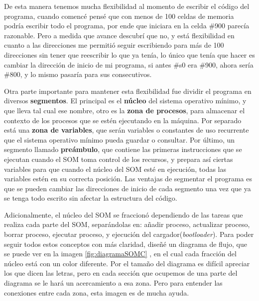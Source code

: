 \documentclass[letterpaper,12pt,oneside]{book}
\begin{document}
        De esta manera tenemos mucha flexibilidad al momento de escribir
		el código del programa, cuando comencé pensé que con menos de 100 celdas de memoria podría escribir todo el programa, por ende que iniciara
		en la celda \#900 parecía razonable. Pero a medida que avance
		descubrí que no, y está flexibilidad en cuanto a las direcciones me permitió seguir escribiendo para más de 100 direcciones sin tener que reescribir
		lo que ya tenía, lo único que tenía que hacer es cambiar la dirección de inicio de mi programa, si antes \#s0 era \#900, ahora sería \#800, y lo mismo
		pasaría para sus consecutivos.
		
		Otra parte importante para mantener esta flexibilidad fue dividir el programa en diversos \textbf{segmentos}. El principal es el \textbf{núcleo} del
		sistema operativo mínimo, y que lleva tal cual ese nombre, otro es la \textbf{zona de procesos}, para almacenar el contexto de los
		procesos que se estén ejecutando en la máquina. Por separado está una \textbf{zona de variables}, que serán variables o constantes de uso recurrente
		que el sistema operativo mínimo pueda guardar o consultar. Por último, un segmento llamado \textbf{preámbulo}, que contiene las primeras instrucciones
		que se ejecutan cuando el SOM toma control de los recursos, y prepara así ciertas variables para que cuando el núcleo del SOM esté en ejecución,
		todas las variables estén en su correcta posición. Las ventajas de segmentar el programa es que se pueden cambiar las direcciones de inicio de cada segmento
		una vez que ya se tenga todo escrito sin afectar la estructura del código.

		
		Adicionalmente, el núcleo del SOM se fraccionó dependiendo de las tareas que realiza cada parte del SOM, separándolas en:
		añadir proceso, actualizar proceso, borrar proceso, ejecutar proceso, y ejecución del cargador(\textit{bootloader}). Para poder seguir todos estos conceptos con más claridad,
		  diseñé un diagrama de flujo, que se puede ver en la imagen \ref{fig:diagramaSOMC}
		, en el cual cada fracción del núcleo está con un color diferente. Por el tamaño del diagrama es difícil apreciar los que dicen las letras, pero
		en cada sección que ocupemos de una parte del diagrama se le hará un acercamiento a esa zona. Pero para entender
		las conexiones entre cada zona, esta imagen es de mucha ayuda.
		
\end{document}
